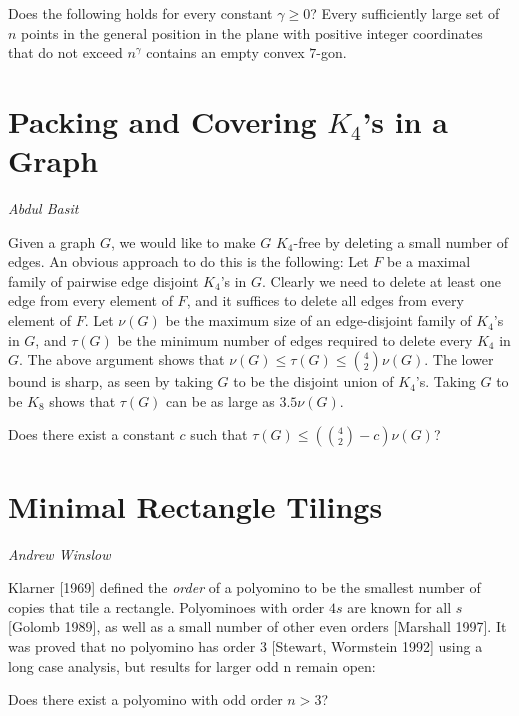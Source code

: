 \documentclass{patmorin}
\begin{document}
\begin{op}\label{prob:int_empty}
 Does the following holds for every constant $\gamma \ge 0$? 
 Every sufficiently large set of $n$ points in the general position in the plane with positive integer coordinates that do not exceed
 $n^{\gamma}$ contains an empty convex $7$-gon.
\end{op}

\section{Packing and Covering $K_4$'s in a Graph}

\noindent\emph{Abdul Basit}

Given a graph $G$, we would like to make $G$ $K_4$-free by deleting a
small number of edges. An obvious approach to do this is the following:
Let $F$ be a maximal family of pairwise edge disjoint $K_4$'s in
$G$. Clearly we need to delete at least one edge from every element of
$F$, and it suffices to delete all edges from every element of $F$. Let
$\nu(G)$ be the maximum size of an edge-disjoint family of $K_4$'s in
$G$, and $\tau(G)$ be the minimum number of edges required to delete
every $K_4$ in $G$. The above argument shows that $\nu(G) \leq \tau(G)
\leq {4 \choose 2} \nu(G)$. The lower bound is sharp, as seen by taking
$G$ to be the disjoint union of $K_4$'s. Taking $G$ to be $K_8$ shows
that $\tau(G)$ can be as large as $3.5 \nu(G)$.

\begin{op}
Does there exist a constant $c$ such that $\tau(G) \leq ({4 \choose 2}
- c) \nu(G)$?
\end{op}


\section{Minimal Rectangle Tilings}

\noindent\emph{Andrew Winslow}

Klarner [1969] defined the \emph{order} of a polyomino to be the smallest number of copies that tile a rectangle. Polyominoes with order $4s$ are known for all $s$ [Golomb 1989], as well as a small number of other even orders [Marshall 1997]. It was proved that no polyomino has order 3 [Stewart, Wormstein 1992] using a long case analysis, but results for larger odd n remain open:

\begin{op}
Does there exist a polyomino with odd order $n > 3$?
\end{op}
\end{document}
